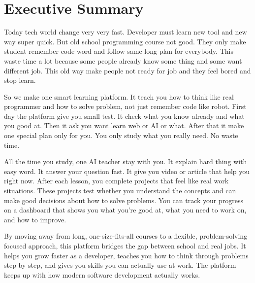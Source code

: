 \documentclass{FastFyp}
\begin{document}
\pagebreak
\section*{Executive Summary}
Today tech world change very very fast. Developer must learn new tool and new way super quick. But old school programming course not good. They only make student remember code word and follow same long plan for everybody. This waste time a lot because some people already know some thing and some want different job. This old way make people not ready for job and they feel bored and stop learn.

So we make one smart learning platform. It teach you how to think like real programmer and how to solve problem, not just remember code like robot. First day the platform give you small test. It check what you know already and what you good at. Then it ask you want learn web or AI or what. After that it make one special plan only for you. You only study what you really need. No waste time.

All the time you study, one AI teacher stay with you. It explain hard thing with easy word. It answer your question fast. It give you video or article that help you right now. After each lesson, you complete projects that feel like real work situations. These projects test whether you understand the concepts and can make good decisions about how to solve problems. You can track your progress on a dashboard that shows you what you're good at, what you need to work on, and how to improve.

By moving away from long, one-size-fits-all courses to a flexible, problem-solving focused approach, this platform bridges the gap between school and real jobs. It helps you grow faster as a developer, teaches you how to think through problems step by step, and gives you skills you can actually use at work. The platform keeps up with how modern software development actually works.
\pagebreak


\pagestyle{fancy} %
\pagestyle{empty}
\renewcommand{\contentsname}{Table of Contents}
\tableofcontents

\listoffigures
{}

\listoftables
{}

\mainmatter

\pagestyle{fancy}
\fancyhf{}                %
\fancyhead[L]{\leftmark}  %
\fancyhead[R]{\thepage}   %
\renewcommand{\headrulewidth}{0.4pt}
\end{document}

